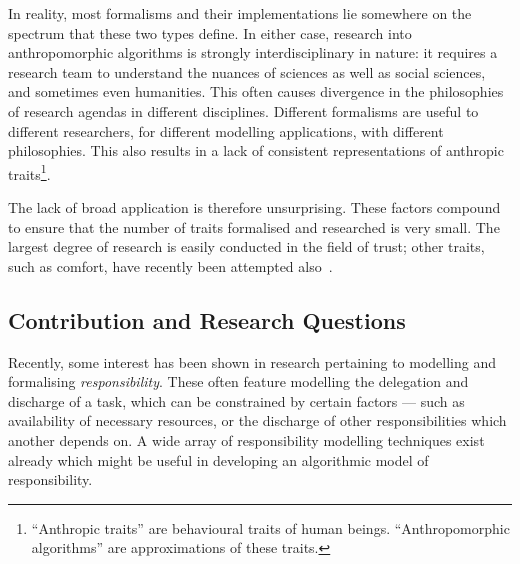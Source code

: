 In reality, most formalisms and their implementations lie somewhere on the spectrum that these two types define. In either case, research into anthropomorphic algorithms is strongly interdisciplinary in nature: it requires a research team to understand the nuances of sciences as well as social sciences, and sometimes even humanities. This often causes divergence in the philosophies of research agendas in different disciplines. Different formalisms are useful to different researchers, for different modelling applications, with different philosophies. This also results in a lack of consistent representations of anthropic traits\footnote{``Anthropic traits'' are behavioural traits of human beings. ``Anthropomorphic algorithms'' are approximations of these traits.}.

The lack of broad application is therefore unsurprising. These factors compound to ensure that the number of traits formalised and researched is very small. The largest degree of research is easily conducted in the field of trust; other traits, such as comfort, have recently been attempted also~\cite{marsh2011defining}.\par

\subsection{Contribution and Research Questions}

Recently, some interest has been shown in research pertaining to modelling and formalising \emph{responsibility}\cite{berreby2015modelling,sommerville_dependable_systems_chap_8,Simpson2011}. These often feature modelling the delegation and discharge of a task, which can be constrained by certain factors --- such as availability of necessary resources, or the discharge of other responsibilities which another depends on. A wide array of responsibility modelling techniques exist already which might be useful in developing an algorithmic model of responsibility.\par


